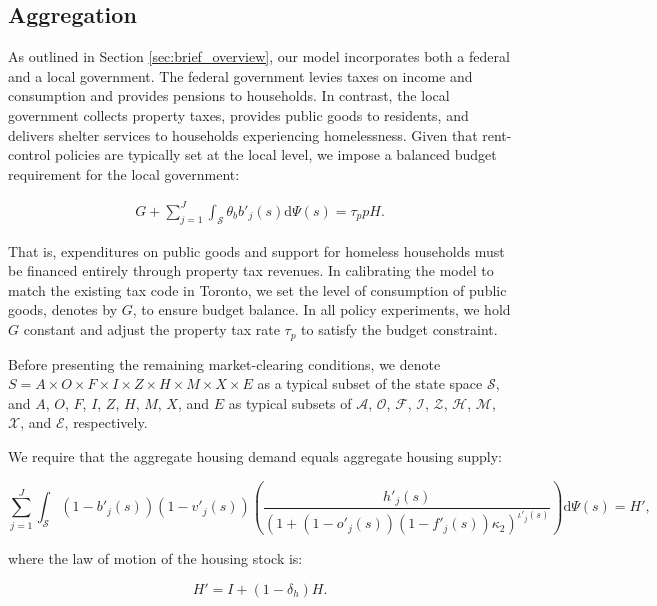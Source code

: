 \documentclass[parskip=full]{article}
\begin{document}
\subsection{Aggregation}\label{subsection:aggregation}

As outlined in Section \ref{sec:brief_overview}, our model incorporates both a federal and a local government. The federal government levies taxes on income and consumption and provides pensions to households. In contrast, the local government collects property taxes, provides public goods to residents, and delivers shelter services to households experiencing homelessness. Given that rent-control policies are typically set at the local level, we impose a balanced budget requirement for the local government:

\begin{align}\label{eq:gbc}
  G + \sum_{j=1}^J \int_\mathcal{S} \theta_{b} b'_{j}(s)\mathrm{d}\Psi(s)  = \tau_{p} p H.
\end{align}

\noindent That is, expenditures on public goods and support for homeless households must be financed entirely through property tax revenues. In calibrating the model to match the existing tax code in Toronto, we set the level of consumption of public goods, denotes by $G$, to ensure budget balance. In all policy experiments, we hold $G$ constant and adjust the property tax rate $\tau_{p}$ to satisfy the budget constraint.

Before presenting the remaining market-clearing conditions, we denote $S=A\times O \times F \times I \times Z \times H\times M\times X \times E$ as a typical subset of the state space $\mathcal{S}$, and $A$, $O$, $F$, $I$, $Z$, $H$, $M$, $X$, and $E$ as typical subsets of $\mathcal{A}$, $\mathcal{O}$, $\mathcal{F}$, $\mathcal{I}$, $\mathcal{Z}$, $\mathcal{H}$, $\mathcal{M}$, $\mathcal{X}$, and $\mathcal{E}$, respectively.

We require that the aggregate housing demand equals aggregate housing supply:

\begin{equation}
\label{eq:housing_clearing_condition}
  \sum_{j=1}^J \int_\mathcal{S} (1-b'_{j}(s))(1-v'_{j}(s)) \left(\frac{h'_{j}(s)}{(1+(1-o'_{j}(s))(1-f'_{j}(s))\kappa_{2})^{\iota'_{j}(s)}}\right) \mathrm{d}\Psi(s) = H',
\end{equation}

\noindent where the law of motion of the housing stock is: 

\begin{equation}\label{eq:housing_stock_lom}
H'=I+(1-\delta_h)H.
\end{equation}
\end{document}

